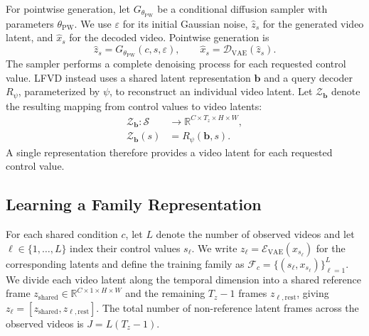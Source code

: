 For pointwise generation, let $G_{\theta_{\mathrm{PW}}}$ be a conditional
diffusion sampler with parameters $\theta_{\mathrm{PW}}$. We use
$\varepsilon$ for its initial Gaussian noise, $\hat z_s$ for the generated
video latent, and $\hat x_s$ for the decoded video. Pointwise generation is
\begin{equation}
    \hat z_s=G_{\theta_{\mathrm{PW}}}(c,s,\varepsilon),\qquad
    \hat x_s=\mathcal D_{\mathrm{VAE}}(\hat z_s).
    \label{eq:baseline_generation}
\end{equation}
The sampler performs a complete denoising process for each requested control
value. LFVD instead uses a shared latent representation $\mathbf b$ and a
query decoder $R_\psi$, parameterized by $\psi$, to reconstruct an individual
video latent. Let $\mathcal Z_{\mathbf b}$ denote the resulting mapping from
control values to video latents:
\begin{equation}
\begin{aligned}
    \mathcal Z_{\mathbf b}:\mathcal S
      &\rightarrow \mathbb R^{C\times T_z\times H\times W},\\
    \mathcal Z_{\mathbf b}(s)&=R_\psi(\mathbf b,s).
\end{aligned}
    \label{eq:latent_function_definition}
\end{equation}
A single representation therefore provides a video latent for each
requested control value.

\subsection{Learning a Family Representation}
\label{sec:codec}

For each shared condition $c$, let $L$ denote the number of observed videos
and let $\ell\in\{1,\ldots,L\}$ index their control values $s_\ell$. We
write $z_\ell=\mathcal E_{\mathrm{VAE}}(x_{s_\ell})$ for the corresponding
latents and define the training family as
$\mathcal F_c=\{(s_\ell,x_{s_\ell})\}_{\ell=1}^{L}$. We divide each video
latent along the temporal dimension into a shared reference frame
$z_{\mathrm{shared}}\in\mathbb R^{C\times1\times H\times W}$ and the
remaining $T_z-1$ frames $z_{\ell,\mathrm{rest}}$, giving
$z_\ell=[z_{\mathrm{shared}},z_{\ell,\mathrm{rest}}]$. The total number of
non-reference latent frames across the observed videos is
$J=L(T_z-1)$.

